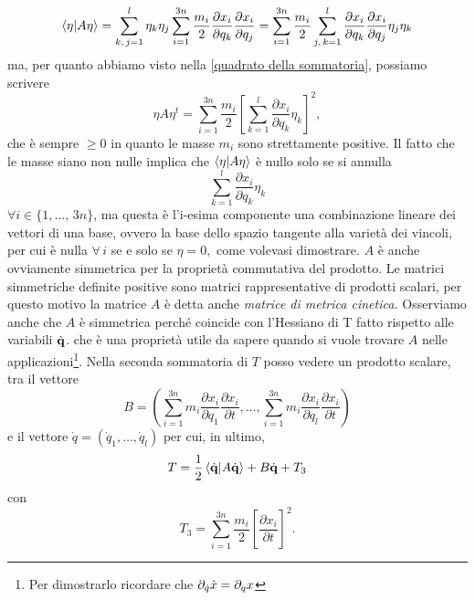     \begin{equation}
       \braket{\eta|A\eta} = \sum_{k,\,j=1}^l \eta_k\eta_j\sum_{i=1}^{3n}\frac{m_i}{2}\frac{\partial x_i}{\partial q_k}\frac{\partial x_i}{\partial q_j} =\sum_{i=1}^{3n}\frac{m_i}{2}\sum_{j,\,k=1}^l\frac{\partial x_i}{\partial q_k}\frac{\partial x_i}{\partial q_j} \eta_j \eta_k 
    \end{equation}
    ma, per quanto abbiamo visto nella \eqref{quadrato della sommatoria}, possiamo scrivere
    \begin{equation}
        \eta A\eta^t = \sum_{i=1}^{3n}\frac{m_i}{2}\left[\sum_{k=1}^l\frac{\partial x_i}{\partial q_k} \eta_k\right]^2,
    \end{equation}
    che è sempre $\geq0$ in quanto le masse $m_i$ sono strettamente positive. Il fatto che le masse siano non nulle implica che $\braket{\eta|A\eta}$ è nullo solo se si annulla
    \begin{equation}
        \sum_{k=1}^l\frac{\partial x_i}{\partial q_k} \eta_k
    \end{equation}
    $\forall i\in\{1,\dots,\,3n\}$, ma questa è l'i-esima componente una combinazione lineare dei vettori di una base, ovvero la base dello spazio tangente alla varietà dei vincoli, per cui è nulla $\forall\,i$ se e solo se $\eta=0,$ come volevasi dimostrare. $A$ è anche ovviamente simmetrica per la proprietà commutativa del prodotto. Le matrici simmetriche definite positive sono matrici rappresentative di prodotti scalari, per questo motivo la matrice $A$ è detta anche \emph{matrice di metrica cinetica.} Osserviamo anche che $A$ è simmetrica perché coincide con l'Hessiano di T fatto rispetto alle variabili $\dot{\mathbf{q}}$.
    che è una proprietà utile da sapere quando si vuole trovare $A$ nelle applicazioni\footnote{Per dimostrarlo ricordare che $\partial_{\dot q}\dot{x}=\partial_q x$}.
    Nella seconda sommatoria di $T$ posso vedere un prodotto scalare, tra il vettore
    \begin{equation}
        B = \left(\sum_{i=1}^{3n}m_i\frac{\partial x_i}{\partial q_1}\frac{\partial x_i}{\partial t},\dots,\sum_{i=1}^{3n}m_i\frac{\partial x_i}{\partial q_l}\frac{\partial x_i}{\partial t}\right)
    \end{equation}
    e il vettore $\dot{q}=(\dot{q}_1,\dots,\dot{q}_l)$ per cui, in ultimo,
    \begin{equation}
        T = \frac{1}{2}\braket{\dot{\mathbf{q}}|A\dot{\mathbf{q}}} + B \dot{\mathbf{q}} + T_3
    \end{equation}
    con 
    \begin{equation}
        T_3 = \sum_{i=1}^{3n}\frac{m_i}{2}\left[\frac{\partial x_i}{\partial t}\right]^2.
    \end{equation}
